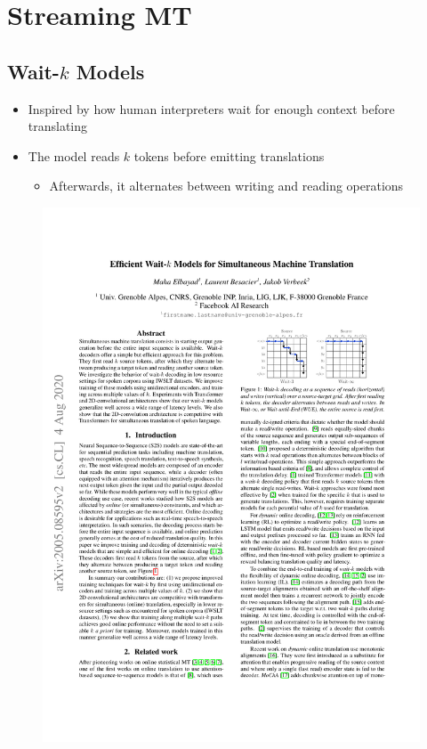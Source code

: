 \documentclass[landscape]{article}
\begin{document}
\cp
\section*{Streaming MT}
\vspace*{10mm}

\subsection*{Wait-$k$ Models}
\vspace*{5mm}
\begin{itemize}\itemsep=5mm
	\item Inspired by how human interpreters wait for enough context before translating
	\item The model reads $k$ tokens before emitting translations
	\begin{itemize}
		\item Afterwards, it alternates between writing and reading operations
	\end{itemize}
\end{itemize}
\begin{figure}[!htp]
\centering
\includegraphics[trim=0.1cm 0.1cm 0.1cm 0.4cm, scale=2.5, clip]{figures/elbayad2020-waitk}
\end{figure}
\end{document}
